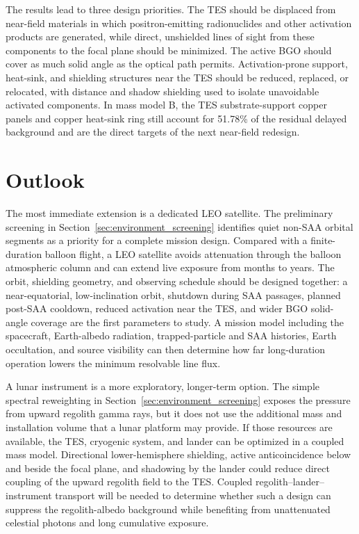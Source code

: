 \documentclass[11pt]{article}
\begin{document}
The results lead to three design priorities. The TES should be displaced from
near-field materials in which positron-emitting radionuclides and other
activation products are generated, while direct, unshielded lines of sight from
these components to the focal plane should be minimized. The active BGO should
cover as much solid angle as the optical path permits.
Activation-prone support, heat-sink, and shielding structures near the TES
should be reduced, replaced, or relocated, with distance and shadow shielding
used to isolate unavoidable activated components. In mass model B, the TES
substrate-support copper panels and copper heat-sink ring still account for
51.78\% of the residual delayed background and are the direct targets of the
next near-field redesign.

\section{Outlook}
\label{sec:outlook}

The most immediate extension is a dedicated LEO satellite. The preliminary
screening in Section~\ref{sec:environment_screening} identifies quiet non-SAA
orbital segments as a priority for a complete mission design. Compared with a
finite-duration balloon flight, a LEO satellite avoids attenuation through the
balloon atmospheric column and can extend live exposure from months to years.
The orbit, shielding geometry, and observing schedule should be designed
together: a near-equatorial, low-inclination orbit, shutdown during SAA
passages, planned post-SAA cooldown, reduced activation near the TES, and wider
BGO solid-angle coverage are the first parameters to study. A mission model
including the spacecraft, Earth-albedo radiation, trapped-particle and SAA
histories, Earth occultation, and source visibility can then determine how far
long-duration operation lowers the minimum resolvable line flux.

A lunar instrument is a more exploratory, longer-term option. The simple
spectral reweighting in Section~\ref{sec:environment_screening} exposes the
pressure from upward regolith gamma rays, but it does not use the additional
mass and installation volume that a lunar platform may provide. If those
resources are available, the TES, cryogenic system, and lander can be optimized
in a coupled mass model. Directional lower-hemisphere shielding, active
anticoincidence below and beside the focal plane, and shadowing by the lander
could reduce direct coupling of the upward regolith field to the TES. Coupled
regolith--lander--instrument transport will be needed to determine whether such
a design can suppress the regolith-albedo background while benefiting from
unattenuated celestial photons and long cumulative exposure.
\end{document}
